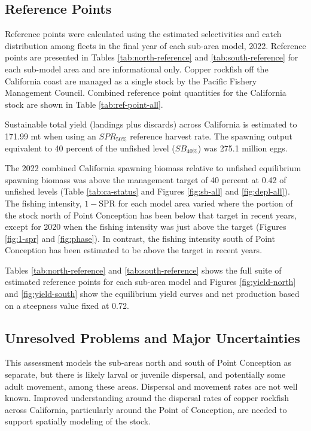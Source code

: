 \documentclass[11pt,
  english,
  letterpaper,
]{article}
\begin{document}
\hypertarget{reference-points-2}{%
\subsection{Reference Points}\label{reference-points-2}}

Reference points were calculated using the estimated selectivities and catch distribution among fleets in the final year of each sub-area model, 2022. Reference points are presented in Tables \ref{tab:north-reference} and \ref{tab:south-reference} for each sub-model area and are informational only. Copper rockfish off the California coast are managed as a single stock by the Pacific Fishery Management Council. Combined reference point quantities for the California stock are shown in Table \ref{tab:ref-point-all}.

Sustainable total yield (landings plus discards) across California is estimated to 171.99 mt when using an \(SPR_{50\%}\) reference harvest rate. The spawning output equivalent to 40 percent of the unfished level (\(SB_{40\%}\)) was 275.1 million eggs.

The 2022 combined California spawning biomass relative to unfished equilibrium spawning biomass was above the management target of 40 percent at 0.42 of unfished levels (Table \ref{tab:ca-status} and Figures \ref{fig:sb-all} and \ref{fig:depl-all}). The fishing intensity, \(1-\text{SPR}\) for each model area varied where the portion of the stock north of Point Conception has been below that target in recent years, except for 2020 when the fishing intensity was just above the target (Figures \ref{fig:1-spr} and \ref{fig:phase}). In contrast, the fishing intensity south of Point Conception has been estimated to be above the target in recent years.

Tables \ref{tab:north-reference} and \ref{tab:south-reference} shows the full suite of estimated reference points for each sub-area model and Figures \ref{fig:yield-north} and \ref{fig:yield-south} show the equilibrium yield curves and net production based on a steepness value fixed at 0.72.

\hypertarget{unresolved-problems-and-major-uncertainties-1}{%
\subsection{Unresolved Problems and Major Uncertainties}\label{unresolved-problems-and-major-uncertainties-1}}

This assessment models the sub-areas north and south of Point Conception as separate, but there is likely larval or juvenile dispersal, and potentially some adult movement, among these areas. Dispersal and movement rates are not well known. Improved understanding around the dispersal rates of copper rockfish across California, particularly around the Point of Conception, are needed to support spatially modeling of the stock.
\end{document}
